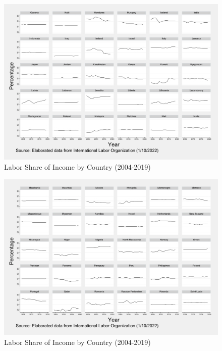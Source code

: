\documentclass[12pt, letterpaper]{article}
\numberwithin{table}{section}   %
\begin{document}
\begin{figure}[htp]
    \centering
    \includegraphics[width=14cm]{Countries90.jpg}
    \caption{Labor Share of Income by Country (2004-2019)}
    \label{fig:4-3}
\end{figure}
\begin{figure}[htp]
    \centering
    \includegraphics[width=14cm]{Countries120.jpg}
    \caption{Labor Share of Income by Country (2004-2019)}
    \label{fig:4-4}
\end{figure}
\end{document}
